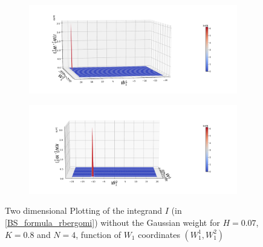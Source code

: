 \documentclass[11pt]{article}
\begin{document}
\begin{figure}[h!]
	\centering
	\begin{subfigure}{.4\textwidth}
		\centering
		\includegraphics[width=1\linewidth]{./figures/integrand_plotting_rBergomi/2D_plots/N_4/integrand_without_density/H_007/Bergomi_integrand_contours_K_08_H_007_W1_1_2_N_4_without_weights_2_80}
		\caption{}
		\label{fig:sub3}
	\end{subfigure}%
	\begin{subfigure}{.4\textwidth}
		\centering
		\includegraphics[width=1\linewidth]{./figures/integrand_plotting_rBergomi/2D_plots/N_4/integrand_without_density/H_007/Bergomi_integrand_contours_K_08_H_007_W1_1_2_N_4_without_weights_2_0}
		\caption{}
		\label{fig:sub4}
	\end{subfigure}
	
	
	
	\caption{Two dimensional Plotting of the integrand $I$ (in \eqref{BS_formula_rbergomi}) without the Gaussian weight  for $H=0.07$, $K=0.8$ and $N=4$, function of $W_1$ coordinates $(W_1^1,W^2_1)$}
	\label{fig:Two dimensional Plotting of the integrand $I$_W12_view_set3}
\end{figure}

\FloatBarrier
\end{document}
